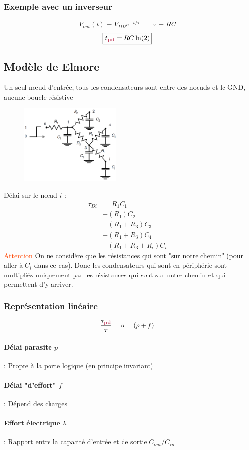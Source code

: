 \documentclass[resume]{subfiles}
\begin{document}
\begin{multicols}{3}
\subsubsection{Exemple avec un inverseur}
$$V_{out}(t)=V_{DD}e^{-t/\tau}\qquad \tau=RC$$
$$\boxed{t_{\pdelay}=RC\ln(2)}$$
\subsection{Modèle de Elmore}
Un seul nœud d'entrée, tous les condensateurs sont entre des noeuds et le GND, aucune boucle résistive
\begin{figure}[H]
\centering
\includegraphics[width=5.00cm]{img_43.png}
\end{figure}
Délai sur le nœud $i$ :
\begin{align*}
\tau_{Di}&=R_1C_1\\&+(R_1)C_2\\&+(R_1+R_3)C_3\\&+(R_1+R_3)C_4\\&+(R_1+R_3+R_i)C_i
\end{align*}
\textcolor{OrangeRed}{Attention} On ne considère que les résistances qui sont "sur notre chemin" (pour aller à $C_i$ dans ce cas). Donc les condensateurs qui sont en périphérie sont multipliés uniquement par les résistances qui sont sur notre chemin et qui permettent d'y arriver.
\subsubsection{Représentation linéaire}
$$\frac{\tau_{\pdelay}}{\tau}=d=(p+f)$$
\paragraph{Délai parasite $p$} : Propre à la porte logique (en principe invariant)
\paragraph{Délai "d'effort" $f$} : Dépend des charges
\paragraph{Effort électrique $h$} : Rapport entre la capacité d'entrée et de sortie $C_{out} / C_{in}$


\end{multicols}
\end{document}
